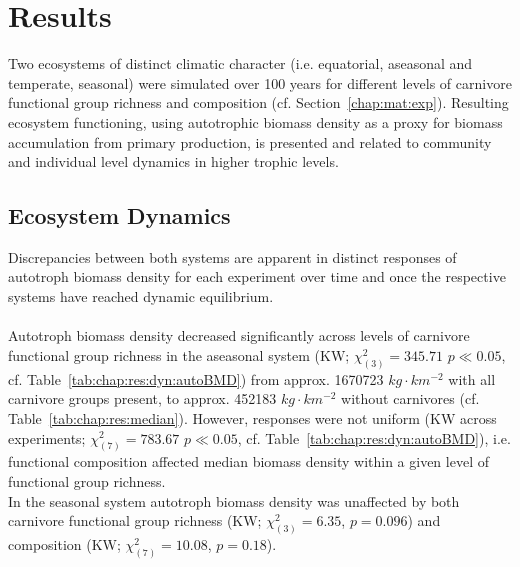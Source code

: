 \chapter{Results}
\label{chap:res}
Two ecosystems of distinct climatic character (i.e. equatorial, aseasonal and temperate, seasonal) were simulated over 100 years for different levels of carnivore functional group richness and composition (cf. Section~\ref{chap:mat:exp}). 
Resulting ecosystem functioning, using autotrophic biomass density as a proxy for biomass accumulation from primary production, is presented and related to community and individual level dynamics in higher trophic levels.
%
\section{Ecosystem Dynamics}
\label{chap:res:dyn} 
Discrepancies between both systems are apparent in distinct responses of autotroph biomass density for each experiment over time and once the respective systems have reached dynamic equilibrium.\\\\
Autotroph biomass density decreased significantly across levels of carnivore functional group richness in the aseasonal system (KW; $\chi^{2}_{(3)} = 345.71$ $p \ll 0.05$, cf. Table~\ref{tab:chap:res:dyn:autoBMD}) from approx. 1670723 $kg\cdot km^{-2}$ with all carnivore groups present, to approx. 452183 $kg\cdot km^{-2}$ without carnivores (cf. Table~\ref{tab:chap:res:median}). 
However, responses were not uniform (KW across experiments; $\chi^{2}_{(7)} = 783.67$ $p \ll 0.05$, cf. Table~\ref{tab:chap:res:dyn:autoBMD}), i.e. functional composition affected median biomass density within a given level of functional group richness. \\
In the seasonal system autotroph biomass density was unaffected by both carnivore functional group richness (KW; $\chi^{2}_{(3)} = 6.35$, $p = 0.096$) and composition (KW; $\chi^{2}_{(7)} = 10.08$, $p = 0.18$).


